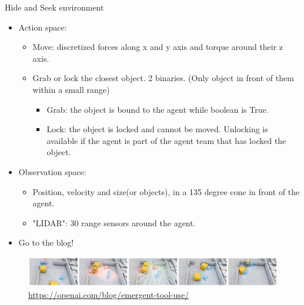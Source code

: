 \documentclass[9pt, hyperref={pdfusetitle,colorlinks=true,allcolors=DarkBlue}]{beamer}
\begin{document}
\begin{frame}{Hide and Seek environment}
\begin{itemize}
    \item Action space:
    \begin{itemize}
        \item Move: discretized forces along x and y axis and torque around their z axis.
        \item Grab or lock the closest object. 2 binaries. (Only object in front of them within a small range)
        \begin{itemize}
        \item Grab: the object is bound to the agent while boolean is True.
        \item Lock: the object is locked and cannot be moved. Unlocking is available if the agent is part of the agent team that has locked the object.
        \end{itemize}{}
        
    \end{itemize}{}
    \item Observation space:
    \begin{itemize}
        \item Position, velocity and size(or objects), in a 135 degree cone in front of the agent.
        \item "LIDAR": 30 range sensors around the agent.
    \end{itemize}{}
    \item Go to the blog!
\end{itemize}{}
    \begin{figure}
    \centering
    \includegraphics[scale=0.2]{hasblog1.png}
        \caption{\url{https://openai.com/blog/emergent-tool-use/}}
    \end{figure}
\end{frame}{}
\end{document}
